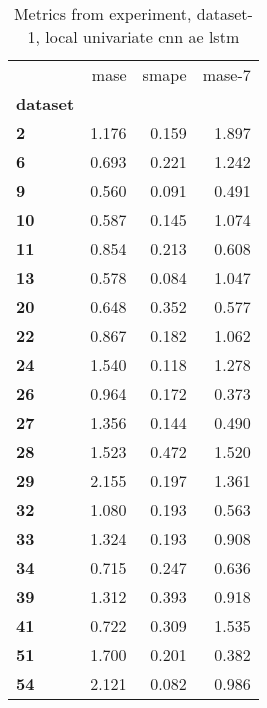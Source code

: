 \begin{table}[h]
\centering
\caption{Metrics from experiment, dataset-1, local univariate cnn ae lstm}
\label{table:local-univariate-cnn-ae-lstm-dataset-1}
\begin{tabular}{lrrr}
\toprule
{} &   mase &  smape &  mase-7 \\
\textbf{dataset} &        &        &         \\
\midrule
\textbf{2      } &  1.176 &  0.159 &   1.897 \\
\textbf{6      } &  0.693 &  0.221 &   1.242 \\
\textbf{9      } &  0.560 &  0.091 &   0.491 \\
\textbf{10     } &  0.587 &  0.145 &   1.074 \\
\textbf{11     } &  0.854 &  0.213 &   0.608 \\
\textbf{13     } &  0.578 &  0.084 &   1.047 \\
\textbf{20     } &  0.648 &  0.352 &   0.577 \\
\textbf{22     } &  0.867 &  0.182 &   1.062 \\
\textbf{24     } &  1.540 &  0.118 &   1.278 \\
\textbf{26     } &  0.964 &  0.172 &   0.373 \\
\textbf{27     } &  1.356 &  0.144 &   0.490 \\
\textbf{28     } &  1.523 &  0.472 &   1.520 \\
\textbf{29     } &  2.155 &  0.197 &   1.361 \\
\textbf{32     } &  1.080 &  0.193 &   0.563 \\
\textbf{33     } &  1.324 &  0.193 &   0.908 \\
\textbf{34     } &  0.715 &  0.247 &   0.636 \\
\textbf{39     } &  1.312 &  0.393 &   0.918 \\
\textbf{41     } &  0.722 &  0.309 &   1.535 \\
\textbf{51     } &  1.700 &  0.201 &   0.382 \\
\textbf{54     } &  2.121 &  0.082 &   0.986 \\
\bottomrule
\end{tabular}
\end{table}
